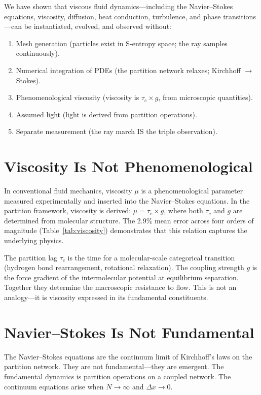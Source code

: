 \documentclass[twocolumn,10pt,a4paper]{article}
\theoremstyle{plain}
\theoremstyle{definition}
\theoremstyle{remark}
\newcommand{\tauc}{\tau_c}
\begin{document}
We have shown that viscous fluid dynamics---including the Navier--Stokes equations, viscosity, diffusion, heat conduction, turbulence, and phase transitions---can be instantiated, evolved, and observed without:
\begin{enumerate}
    \item Mesh generation (particles exist in S-entropy space; the ray samples continuously).
    \item Numerical integration of PDEs (the partition network relaxes; Kirchhoff $\to$ Stokes).
    \item Phenomenological viscosity (viscosity is $\tauc \times g$, from microscopic quantities).
    \item Assumed light (light is derived from partition operations).
    \item Separate measurement (the ray march IS the triple observation).
\end{enumerate}

\section{Viscosity Is Not Phenomenological}
\label{sec:visc_discuss}

In conventional fluid mechanics, viscosity $\mu$ is a phenomenological parameter measured experimentally and inserted into the Navier--Stokes equations. In the partition framework, viscosity is derived: $\mu = \tauc \times g$, where both $\tauc$ and $g$ are determined from molecular structure. The 2.9\% mean error across four orders of magnitude (Table~\ref{tab:viscosity}) demonstrates that this relation captures the underlying physics.

The partition lag $\tauc$ is the time for a molecular-scale categorical transition (hydrogen bond rearrangement, rotational relaxation). The coupling strength $g$ is the force gradient of the intermolecular potential at equilibrium separation. Together they determine the macroscopic resistance to flow. This is not an analogy---it is viscosity expressed in its fundamental constituents.

\section{Navier--Stokes Is Not Fundamental}
\label{sec:ns_discuss}

The Navier--Stokes equations are the continuum limit of Kirchhoff's laws on the partition network. They are not fundamental---they are emergent. The fundamental dynamics is partition operations on a coupled network. The continuum equations arise when $N \to \infty$ and $\Delta x \to 0$.
\end{document}

